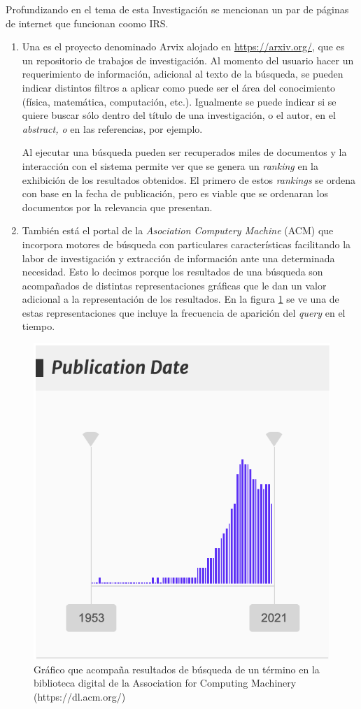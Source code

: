\documentclass[
  10,
  openany]{book}
\begin{document}
Profundizando en el tema de esta Investigación se mencionan un par de páginas de internet que funcionan coomo IRS.

\begin{enumerate}
\def\labelenumi{\arabic{enumi}.}
\item
  Una es el proyecto denominado Arvix alojado en \url{https://arxiv.org/}, que es un repositorio de trabajos de investigación. Al momento del usuario hacer un requerimiento de información, adicional al texto de la búsqueda, se pueden indicar distintos filtros a aplicar como puede ser el área del conocimiento (física, matemática, computación, etc.). Igualmente se puede indicar si se quiere buscar sólo dentro del título de una investigación, o el autor, en el \emph{abstract, o} en las referencias, por ejemplo.

  Al ejecutar una búsqueda pueden ser recuperados miles de documentos y la interacción con el sistema permite ver que se genera un \emph{ranking} en la exhibición de los resultados obtenidos. El primero de estos \emph{rankings} se ordena con base en la fecha de publicación, pero es viable que se ordenaran los documentos por la relevancia que presentan.
\item
  También está el portal de la \emph{Asociation Computery Machine} (ACM) que incorpora motores de búsqueda con particulares características facilitando la labor de investigación y extracción de información ante una determinada necesidad. Esto lo decimos porque los resultados de una búsqueda son acompañados de distintas representaciones gráficas que le dan un valor adicional a la representación de los resultados. En la figura \ref{fig:busquedasacm} se ve una de estas representaciones que incluye la frecuencia de aparición del \emph{query} en el tiempo.
\end{enumerate}

\begin{figure}

{\centering \includegraphics[width=0.4\linewidth]{images/03-marco-teorico/busquedaacm} 

}

\caption{Gráfico que acompaña resultados de búsqueda de un término en la biblioteca digital de la Association for Computing Machinery (https://dl.acm.org/)}\label{fig:busquedasacm}
\end{figure}
\end{document}

